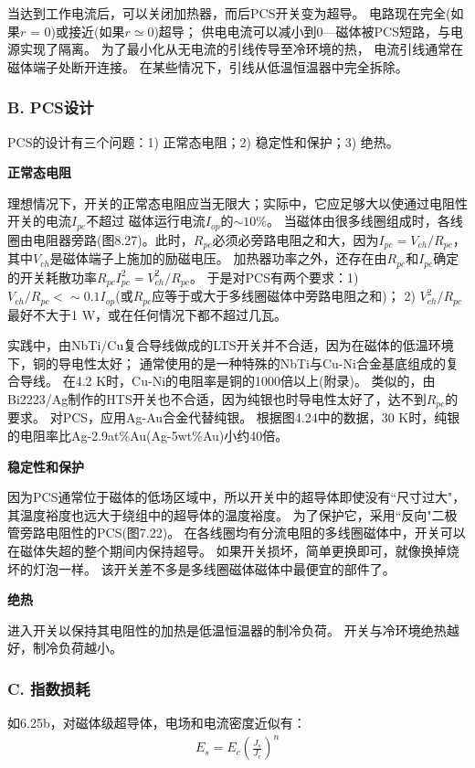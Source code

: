 当达到工作电流后，可以关闭加热器，而后PCS开关变为超导。
电路现在完全(如果$r$ = 0)或接近(如果$r\simeq 0$)超导；
供电电流可以减小到0---磁体被PCS短路，与电源实现了隔离。
为了最小化从无电流的引线传导至冷环境的热，
电流引线通常在磁体端子处断开连接。
 在某些情况下，引线从低温恒温器中完全拆除。

\subsubsection*{B. PCS设计}
PCS的设计有三个问题：1) 正常态电阻；2) 稳定性和保护；3) 绝热。

\textbf{正常态电阻}

理想情况下，开关的正常态电阻应当无限大；实际中，它应足够大以使通过电阻性开关的电流$I_{pc}$不超过
磁体运行电流$I_{op}$的$\sim 10\%$。
当磁体由很多线圈组成时，各线圈由电阻器旁路(图8.27)。此时，$R_{pc}$必须必旁路电阻之和大，因为$I_{pc}=V_{ch}/R_{pc}$，
其中$V_{ch}$是磁体端子上施加的励磁电压。
加热器功率之外，还存在由$R_{pc}$和$I_{pc}$确定的开关耗散功率$R_{pc}I_{pc}^2=V_{ch}^2/R_{pc}$。
于是对PCS有两个要求：1) $V_{ch}/R_{pc}<\sim 0.1 I_{op}$(或$R_{pc}$应等于或大于多线圈磁体中旁路电阻之和)；
2) $V_{ch}^2/R_{pc}$最好不大于1 W，或在任何情况下都不超过几瓦。

实践中，由NbTi/Cu复合导线做成的LTS开关并不合适，因为在磁体的低温环境下，铜的导电性太好；
通常使用的是一种特殊的NbTi与Cu-Ni合金基底组成的复合导线。
在4.2 K时，Cu-Ni的电阻率是铜的1000倍以上(附录)。
类似的，由Bi2223/Ag制作的HTS开关也不合适，因为纯银也时导电性太好了，达不到$R_{pc}$的要求。
对PCS，应用Ag-Au合金代替纯银。
根据图4.24中的数据，30 K时，纯银的电阻率比Ag-2.9at\%Au(Ag-5wt\%Au)小约40倍。

\textbf{稳定性和保护}

因为PCS通常位于磁体的低场区域中，所以开关中的超导体即使没有``尺寸过大"，
其温度裕度也远大于绕组中的超导体的温度裕度。
为了保护它，采用``反向"二极管旁路电阻性的PCS(图7.22)。
在各线圈均有分流电阻的多线圈磁体中，开关可以在磁体失超的整个期间内保持超导。
如果开关损坏，简单更换即可，就像换掉烧坏的灯泡一样。
该开关差不多是多线圈磁体磁体中最便宜的部件了。

\textbf{绝热}

进入开关以保持其电阻性的加热是低温恒温器的制冷负荷。
开关与冷环境绝热越好，制冷负荷越小。

\subsubsection*{C. 指数损耗}
如6.25b，对磁体级超导体，电场和电流密度近似有：
\begin{align*}%
E_s=E_c\left(\frac{J_s}{J_c}\right)^n \tag{6.25b}
\end{align*}

